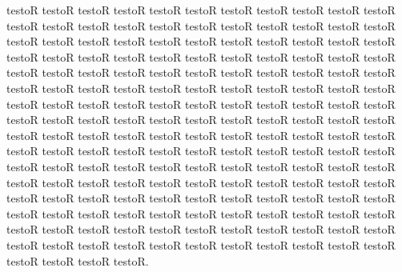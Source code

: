 \documentclass[11pt,a4paper]{book}
\begin{document}
\begin{pages}
\begin{Rightside}
\pstart testoR testoR testoR testoR testoR testoR testoR testoR testoR testoR testoR testoR testoR testoR testoR testoR testoR testoR testoR testoR testoR testoR testoR testoR testoR testoR testoR testoR testoR testoR testoR testoR testoR testoR testoR testoR testoR testoR testoR testoR testoR testoR testoR testoR testoR testoR testoR testoR testoR testoR testoR testoR testoR testoR testoR testoR testoR testoR testoR testoR testoR testoR testoR testoR testoR testoR testoR testoR testoR testoR testoR testoR testoR testoR testoR testoR testoR testoR testoR testoR testoR testoR testoR testoR testoR testoR testoR testoR testoR testoR testoR testoR testoR testoR testoR testoR testoR testoR testoR testoR testoR testoR testoR testoR testoR testoR testoR testoR testoR testoR testoR testoR testoR testoR testoR testoR testoR testoR testoR testoR testoR testoR testoR testoR testoR testoR testoR testoR testoR testoR testoR testoR testoR testoR testoR testoR testoR testoR testoR testoR testoR testoR testoR testoR testoR testoR testoR testoR testoR testoR testoR testoR testoR testoR testoR testoR testoR testoR testoR testoR testoR testoR testoR testoR testoR testoR testoR testoR testoR testoR testoR testoR testoR testoR testoR testoR testoR testoR testoR testoR.\pend

\endnumbering
\end{Rightside}
\Pages
\end{pages}
\end{document}
